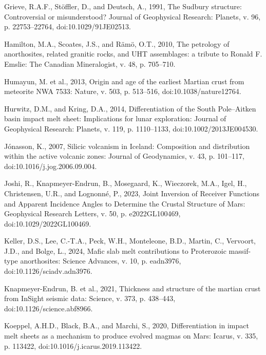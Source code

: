 \documentclass[11pt]{article}
\begin{document}
\begin{thebibliography}{99}
 Grieve, R.A.F., Stöffler, D., and Deutsch, A., 1991, The Sudbury structure: Controversial or misunderstood? Journal of Geophysical Research: Planets, v. 96, p. 22753--22764, doi:10.1029/91JE02513.

 Hamilton, M.A., Scoates, J.S., and Rämö, O.T., 2010, The petrology of anorthosites, related granitic rocks, and UHT assemblages: a tribute to Ronald F. Emslie: The Canadian Mineralogist, v. 48, p. 705--710.

 Humayun, M. et al., 2013, Origin and age of the earliest Martian crust from meteorite NWA 7533: Nature, v. 503, p. 513--516, doi:10.1038/nature12764.

 Hurwitz, D.M., and Kring, D.A., 2014, Differentiation of the South Pole--Aitken basin impact melt sheet: Implications for lunar exploration: Journal of Geophysical Research: Planets, v. 119, p. 1110--1133, doi:10.1002/2013JE004530.

 Jónasson, K., 2007, Silicic volcanism in Iceland: Composition and distribution within the active volcanic zones: Journal of Geodynamics, v. 43, p. 101--117, doi:10.1016/j.jog.2006.09.004.

 Joshi, R., Knapmeyer-Endrun, B., Mosegaard, K., Wieczorek, M.A., Igel, H., Christensen, U.R., and Lognonné, P., 2023, Joint Inversion of Receiver Functions and Apparent Incidence Angles to Determine the Crustal Structure of Mars: Geophysical Research Letters, v. 50, p. e2022GL100469, doi:10.1029/2022GL100469.

 Keller, D.S., Lee, C.-T.A., Peck, W.H., Monteleone, B.D., Martin, C., Vervoort, J.D., and Bolge, L., 2024, Mafic slab melt contributions to Proterozoic massif-type anorthosites: Science Advances, v. 10, p. eadn3976, doi:10.1126/sciadv.adn3976.

 Knapmeyer-Endrun, B. et al., 2021, Thickness and structure of the martian crust from InSight seismic data: Science, v. 373, p. 438--443, doi:10.1126/science.abf8966.

 Koeppel, A.H.D., Black, B.A., and Marchi, S., 2020, Differentiation in impact melt sheets as a mechanism to produce evolved magmas on Mars: Icarus, v. 335, p. 113422, doi:10.1016/j.icarus.2019.113422.


\end{thebibliography}
\end{document}
